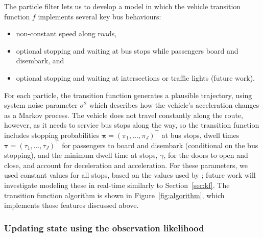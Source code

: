 The particle filter lets us to develop a model in which
the vehicle transition function $f$ implements several key bus behaviours:
\begin{itemize}
\item non-constant speed along roads,
\item optional stopping and waiting at bus stops while passengers board and disembark, and
\item optional stopping and waiting at intersections or traffic lights (future work).
\end{itemize}

For each particle, the transition function generates a plausible trajectory,
using system noise parameter $\sigma^2$ which describes 
how the vehicle's acceleration changes as a Markov process.
The vehicle does not travel constantly along the route,
however, as it needs to service bus stops along the way,
so the transition function includes 
stopping probabilities $\boldsymbol\pi = (\pi_1,\ldots,\pi_J)^\top$ at bus stops,
dwell times $\boldsymbol\tau = (\tau_1,\ldots,\tau_J)^\top$ for passengers to
board and disembark (conditional on the bus stopping),
and the minimum dwell time at stops, $\gamma$,
for the doors to open and close,
and account for deceleration and acceleration.
For these parameters, we used constant values for all stops,
based on the values used by \cite{Hans_2015};
future work will investigate modeling these in real-time similarly to Section~\ref{sec:kf}.
The transition function algorithm is shown in Figure~\ref{fig:algorithm},
which implements those features discussed above.



\subsubsection{Updating state using the observation likelihood}
\label{sec:pf_update}

